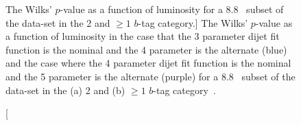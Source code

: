 \begin{figure}[!htb]
  \begin{center}
    \captionsetup[subfigure]{aboveskip=0pt,justification=centering}
  \end{center}
  \vspace{-1em}
  \caption
      [The Wilks' \mbox{$p$-value} as a function of luminosity for a 8.8~\ifb{} subset of the \summer{} data-set in the 2 and $\geq1$ $b$-tag category.]
      {The Wilks' \mbox{$p$-value} as a function of luminosity
        in the case that the 3 parameter dijet fit function is the nominal and the 4 parameter is the alternate (blue)
        and the case where the 4 parameter dijet fit function is the nominal and the 5 parameter is the alternate (purple)
        for a 8.8~\ifb{} subset of the \summer{} data-set in the (a) 2 and (b) $\geq1$ $b$-tag category~\cite{dibjet-ichep_conf}.
      }
  \label{fig:bkg-summer-wilks}
\end{figure}

